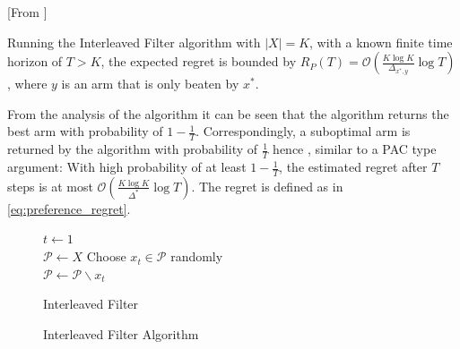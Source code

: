 \documentclass{llncs}
\begin{document}
	\begin{theorem}\label{thm:IF}[From \cite{...}]

		Running the Interleaved Filter algorithm with $|X|=K$, with a known finite time horizon of $T>K$, the expected regret is bounded by $R_P(T) = \mathcal{O} \left( \frac{K\log K}{\Delta_{x^*,y}} \log T \right)$, where $y$ is an arm that is only beaten by $x^*$.

	\end{theorem}
	From the analysis of the algorithm it can be seen that the algorithm returns the best arm with probability of $1-\frac{1}{T}$.
	Correspondingly, a suboptimal arm is returned by the algorithm with probability of $\frac{1}{T}$ hence , similar to a PAC type argument: With high probability of at least $1-\frac{1}{T}$, the estimated regret after $T$ steps is at most $\mathcal{O} \left( \frac{K\log K}{\Delta^*} \log T \right)$. The regret is defined as in \eqref{eq:preference_regret}.
	
	\begin{figure}[h]
	\IncMargin{1em}
		\begin{algorithm}[H]
		
			$ t\leftarrow 1$\\
			$ \mathcal{P} \leftarrow X$
			Choose $x_t \in \mathcal{P}$ randomly\\
			$ \mathcal{P} \leftarrow \mathcal{P} \backslash x_t$\\
			\BlankLine
			\caption{Interleaved Filter}
		\end{algorithm}
		\caption{Interleaved Filter Algorithm}\label{algo_IF}
	\end{figure}
	
\end{document}

